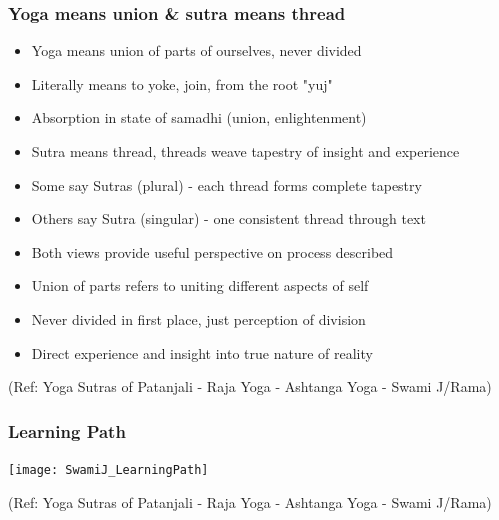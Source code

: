 \begin{frame}[fragile]\frametitle{Yoga means union \& sutra means thread}

\begin{itemize}
\item Yoga means union of parts of ourselves, never divided
\item Literally means to yoke, join, from the root "yuj"
\item Absorption in state of samadhi (union, enlightenment)
\item Sutra means thread, threads weave tapestry of insight and experience
\item Some say Sutras (plural) - each thread forms complete tapestry
\item Others say Sutra (singular) - one consistent thread through text
\item Both views provide useful perspective on process described
\item Union of parts refers to uniting different aspects of self
\item Never divided in first place, just perception of division
\item Direct experience and insight into true nature of reality
\end{itemize}

  
  \tiny{(Ref: Yoga Sutras of Patanjali - Raja Yoga - Ashtanga Yoga - Swami J/Rama)}

\end{frame}


\begin{frame}[fragile]\frametitle{Learning Path}

\begin{center}
\texttt{[image: SwamiJ\_LearningPath]}

\end{center}

  
  \tiny{(Ref: Yoga Sutras of Patanjali - Raja Yoga - Ashtanga Yoga - Swami J/Rama)}

\end{frame}


